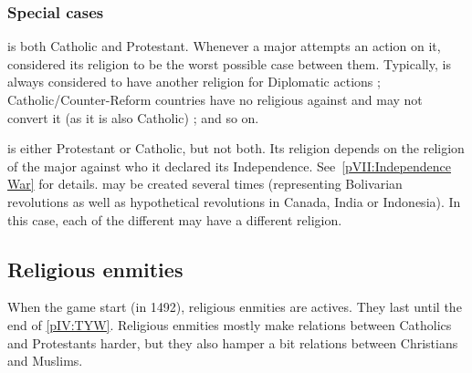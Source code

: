 \subsubsection{Special cases}
\aparag \paysSuisse is both Catholic and Protestant.
\bparag Whenever a major attempts an action on it, considered its religion to
be the worst possible case between them.
\bparag Typically, \paysSuisse is always considered to have another religion
for Diplomatic actions ; Catholic/Counter-Reform countries have no religious
\CB against \paysSuisse and may not convert it (as it is also Catholic) ; and
so on.

\aparag \paysUSA is either Protestant or Catholic, but not both.
\bparag Its religion depends on the religion of the major against who it
declared its Independence. See~\ref{pVII:Independence War} for details.
\bparag \paysUSA may be created several times (representing Bolivarian
revolutions as well as hypothetical revolutions in Canada, India or
Indonesia). In this case, each of the different \paysUSA may have a different
religion.



\subsection{Religious enmities}

\aparag When the game start (in 1492), religious enmities are actives. They
last until the end of \ref{pIV:TYW}.
\bparag Religious enmities mostly make relations between Catholics and
Protestants harder, but they also hamper a bit relations between Christians
and Muslims.




